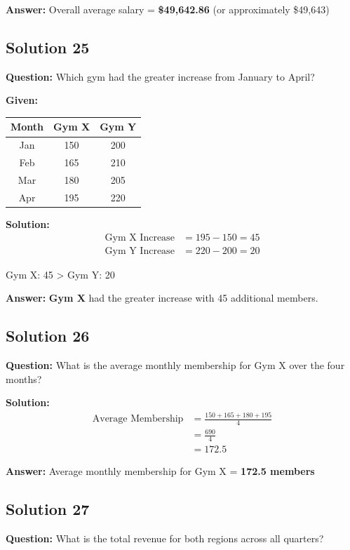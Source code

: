\documentclass[12pt,a4paper]{article}
\begin{document}
\textbf{Answer:} Overall average salary = \textbf{\$49,642.86} (or approximately \$49,643)

\subsection*{Solution 25}
\textbf{Question:} Which gym had the greater increase from January to April?

\textbf{Given:}
\begin{center}
\begin{tabular}{|c|c|c|}
\hline
Month & Gym X & Gym Y \\
\hline
Jan & 150 & 200 \\
Feb & 165 & 210 \\
Mar & 180 & 205 \\
Apr & 195 & 220 \\
\hline
\end{tabular}
\end{center}

\textbf{Solution:}
\begin{align*}
\text{Gym X Increase} &= 195 - 150 = 45 \\
\text{Gym Y Increase} &= 220 - 200 = 20
\end{align*}

Gym X: 45 > Gym Y: 20

\textbf{Answer:} \textbf{Gym X} had the greater increase with 45 additional members.

\subsection*{Solution 26}
\textbf{Question:} What is the average monthly membership for Gym X over the four months?

\textbf{Solution:}
\begin{align*}
\text{Average Membership} &= \frac{150 + 165 + 180 + 195}{4} \\
&= \frac{690}{4} \\
&= 172.5
\end{align*}

\textbf{Answer:} Average monthly membership for Gym X = \textbf{172.5 members}

\subsection*{Solution 27}
\textbf{Question:} What is the total revenue for both regions across all quarters?
\end{document}
